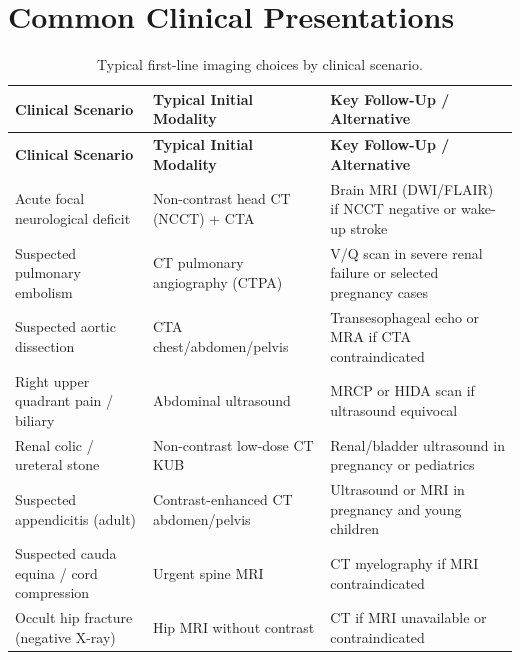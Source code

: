 \section{Common Clinical Presentations}

\begin{longtable}{@{}p{}p{}p{}@{}}
\caption{Typical first-line imaging choices by clinical scenario.}
\label{tab:app_clinical_selection} \\
\toprule
\textbf{Clinical Scenario} & \textbf{Typical Initial Modality} & \textbf{Key Follow-Up / Alternative} \\
\midrule
\endfirsthead
\toprule
\textbf{Clinical Scenario} & \textbf{Typical Initial Modality} & \textbf{Key Follow-Up / Alternative} \\
\midrule
\endhead
Acute focal neurological deficit & Non-contrast head CT (NCCT) + CTA & Brain MRI (DWI/FLAIR) if NCCT negative or wake-up stroke \\
Suspected pulmonary embolism & CT pulmonary angiography (CTPA) & V/Q scan in severe renal failure or selected pregnancy cases \\
Suspected aortic dissection & CTA chest/abdomen/pelvis & Transesophageal echo or MRA if CTA contraindicated \\
Right upper quadrant pain / biliary & Abdominal ultrasound & MRCP or HIDA scan if ultrasound equivocal \\
Renal colic / ureteral stone & Non-contrast low-dose CT KUB & Renal/bladder ultrasound in pregnancy or pediatrics \\
Suspected appendicitis (adult) & Contrast-enhanced CT abdomen/pelvis & Ultrasound or MRI in pregnancy and young children \\
Suspected cauda equina / cord compression & Urgent spine MRI & CT myelography if MRI contraindicated \\
Occult hip fracture (negative X-ray) & Hip MRI without contrast & CT if MRI unavailable or contraindicated \\
\bottomrule
\end{longtable}
